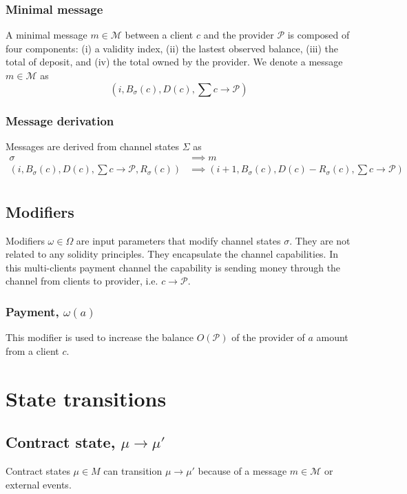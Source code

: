 \documentclass{llncs}
\begin{document}
\subsubsection{Minimal message} A minimal message $m \in \mathcal{M}$ between a client $c$ and the provider $\mathcal{P}$ is composed of four components: (i) a validity index, (ii) the lastest observed balance, (iii) the total of deposit, and (iv) the total owned by the provider. We denote a message $m \in \mathcal{M}$ as
$$(i, B_\sigma(c), D(c), \textstyle \sum c \rightarrow \mathcal{P})$$

\subsubsection{Message derivation} Messages are derived from channel states $\Sigma$ as
\begin{equation*}
\begin{split}
    \sigma &\implies m \\
    (i, B_\sigma(c), D(c), \textstyle \sum c \rightarrow \mathcal{P},R_\sigma(c)) &\implies (i+1, B_\sigma(c), D(c)-R_\sigma(c), \textstyle \sum c \rightarrow \mathcal{P}) \\
\end{split}
\end{equation*}

\subsection{Modifiers} Modifiers $\omega \in \Omega$ are input parameters that modify channel states $\sigma$. They are not related to any solidity principles. They encapsulate the channel capabilities. In this multi-clients payment channel the capability is sending money through the channel from clients to provider, i.e. $c \rightarrow \mathcal{P}$.

\subsubsection{Payment, $\omega(a)$} This modifier is used to increase the balance $O(\mathcal{P})$ of the provider of $a$ amount from a client $c$.

\section{State transitions}

\subsection{Contract state, $\mu \rightarrow \mu'$} Contract states $\mu \in M$ can transition $\mu \rightarrow \mu'$ because of a message $m \in \mathcal{M}$ or external events.
\end{document}
